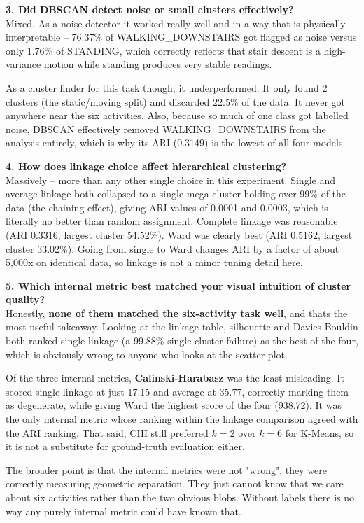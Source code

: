 \documentclass[12pt,a4paper]{article}
\begin{document}
\textbf{3. Did DBSCAN detect noise or small clusters effectively?}\\
Mixed. As a noise detector it worked really well and in a way that is physically interpretable -- 76.37\% of WALKING\_DOWNSTAIRS got flagged as noise versus only 1.76\% of STANDING, which correctly reflects that stair descent is a high-variance motion while standing produces very stable readings.

As a cluster finder for this task though, it underperformed. It only found 2 clusters (the static/moving split) and discarded 22.5\% of the data. It never got anywhere near the six activities. Also, because so much of one class got labelled noise, DBSCAN effectively removed WALKING\_DOWNSTAIRS from the analysis entirely, which is why its ARI (0.3149) is the lowest of all four models.

\textbf{4. How does linkage choice affect hierarchical clustering?}\\
Massively -- more than any other single choice in this experiment. Single and average linkage both collapsed to a single mega-cluster holding over 99\% of the data (the chaining effect), giving ARI values of 0.0001 and 0.0003, which is literally no better than random assignment. Complete linkage was reasonable (ARI 0.3316, largest cluster 54.52\%). Ward was clearly best (ARI 0.5162, largest cluster 33.02\%). Going from single to Ward changes ARI by a factor of about 5,000x on identical data, so linkage is not a minor tuning detail here.

\textbf{5. Which internal metric best matched your visual intuition of cluster quality?}\\
Honestly, \textbf{none of them matched the six-activity task well}, and thats the most useful takeaway. Looking at the linkage table, silhouette and Davies-Bouldin both ranked single linkage (a 99.88\% single-cluster failure) as the best of the four, which is obviously wrong to anyone who looks at the scatter plot.

Of the three internal metrics, \textbf{Calinski-Harabasz} was the least misleading. It scored single linkage at just 17.15 and average at 35.77, correctly marking them as degenerate, while giving Ward the highest score of the four (938.72). It was the only internal metric whose ranking within the linkage comparison agreed with the ARI ranking. That said, CHI still preferred $k=2$ over $k=6$ for K-Means, so it is not a substitute for ground-truth evaluation either.

The broader point is that the internal metrics were not "wrong", they were correctly measuring geometric separation. They just cannot know that we care about six activities rather than the two obvious blobs. Without labels there is no way any purely internal metric could have known that.
\end{document}
